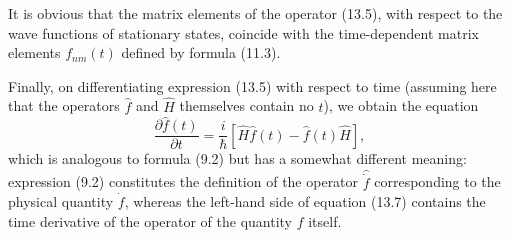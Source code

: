 It is obvious that the matrix elements of the operator (13.5), with respect to
the wave functions of stationary states, coincide with the time-dependent
matrix elements $f_{nm}(t)$ defined by formula (11.3).

Finally, on differentiating expression (13.5) with respect to time (assuming
here that the operators $\hat f$ and $\hat H$ themselves contain no $t$), we
obtain the equation
\begin{equation}
  \frac{\partial\hat f(t)}{\partial t}
  =\frac{i}{\hbar}\left[\hat H\hat f(t)-\hat f(t)\hat H\right],
  \tag{13.7}
\end{equation}
which is analogous to formula (9.2) but has a somewhat different meaning:
expression (9.2) constitutes the definition of the operator $\hat{\dot f}$
corresponding to the physical quantity $\dot f$, whereas the left-hand side of
equation (13.7) contains the time derivative of the operator of the quantity
$f$ itself.
